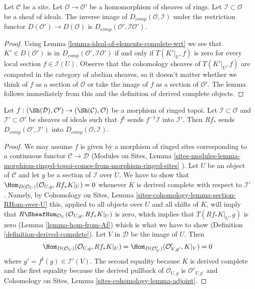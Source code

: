 \begin{lemma}
\label{lemma-restriction-derived-complete}
Let $\mathcal{C}$ be a site. Let $\mathcal{O} \to \mathcal{O}'$
be a homomorphism of sheaves of rings. Let $\mathcal{I} \subset \mathcal{O}$
be a sheaf of ideals. The inverse image of $D_{comp}(\mathcal{O}, \mathcal{I})$
under the restriction functor $D(\mathcal{O}') \to D(\mathcal{O})$ is
$D_{comp}(\mathcal{O}', \mathcal{I}\mathcal{O}')$.
\end{lemma}

\begin{proof}
Using Lemma \ref{lemma-ideal-of-elements-complete-wrt}
we see that $K' \in D(\mathcal{O}')$ is in
$D_{comp}(\mathcal{O}', \mathcal{I}\mathcal{O}')$
if and only if $T(K'|_U, f)$ is zero for every local section
$f \in \mathcal{I}(U)$. Observe that the cohomology sheaves of
$T(K'|_U, f)$ are computed in the category of abelian sheaves,
so it doesn't matter whether we think of $f$ as a section of
$\mathcal{O}$ or take the image of $f$ as a section of $\mathcal{O}'$.
The lemma follows immediately from this and the
definition of derived complete objects.
\end{proof}

\begin{lemma}
\label{lemma-pushforward-derived-complete}
Let $f : (\Sh(\mathcal{D}), \mathcal{O}') \to (\Sh(\mathcal{C}), \mathcal{O})$
be a morphism of ringed topoi. Let $\mathcal{I} \subset \mathcal{O}$
and $\mathcal{I}' \subset \mathcal{O}'$ be sheaves of ideals such
that $f^\sharp$ sends $f^{-1}\mathcal{I}$ into $\mathcal{I}'$.
Then $Rf_*$ sends $D_{comp}(\mathcal{O}', \mathcal{I}')$
into $D_{comp}(\mathcal{O}, \mathcal{I})$.
\end{lemma}

\begin{proof}
We may assume $f$ is given by a morphism of ringed sites corresponding
to a continuous functor $\mathcal{C} \to \mathcal{D}$
(Modules on Sites, Lemma
\ref{sites-modules-lemma-morphism-ringed-topoi-comes-from-morphism-ringed-sites}
).
Let $U$ be an object of $\mathcal{C}$ and let $g$ be a section of
$\mathcal{I}$ over $U$. We have to show that
$\Hom_{D(\mathcal{O}_U)}(\mathcal{O}_{U, g}, Rf_*K|_U) = 0$
whenever $K$ is derived complete with respect to $\mathcal{I}'$.
Namely, by Cohomology on Sites, Lemma
\ref{sites-cohomology-lemma-section-RHom-over-U}
this, applied to all objects over $U$ and all shifts of $K$,
will imply that $R\SheafHom_{\mathcal{O}_U}(\mathcal{O}_{U, g}, Rf_*K|_U)$
is zero, which implies that $T(Rf_*K|_U, g)$ is zero
(Lemma \ref{lemma-hom-from-Af}) which is what we have to show
(Definition \ref{definition-derived-complete}).
Let $V$ in $\mathcal{D}$ be the image of $U$. Then
$$
\Hom_{D(\mathcal{O}_U)}(\mathcal{O}_{U, g}, Rf_*K|_U) =
\Hom_{D(\mathcal{O}'_V)}(\mathcal{O}'_{V, g'}, K|_V) = 0
$$
where $g' = f^\sharp(g) \in \mathcal{I}'(V)$. The second equality
because $K$ is derived complete and the first equality because
the derived pullback of $\mathcal{O}_{U, g}$ is $\mathcal{O}'_{V, g'}$
and
Cohomology on Sites, Lemma \ref{sites-cohomology-lemma-adjoint}.
\end{proof}

